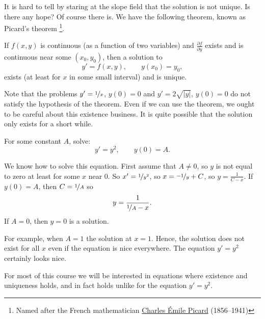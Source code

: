It is hard to tell by staring at the slope field that the
solution is not
unique.
Is there any hope?
Of course there is.  We have the following theorem,
known as Picard's theorem%
\footnote{Named after the French mathematician
\href{https://en.wikipedia.org/wiki/Charles_\%C3\%89mile_Picard}{Charles \'Emile Picard}
(1856--1941)}. 

\begin{theorem}%
\label{slope:picardthm}%
If $f(x,y)$ is continuous (as a function of two
variables) and $\frac{\partial f}{\partial y}$ exists and is
continuous near some $(x_0,y_0)$, then a solution to
\begin{equation*}
y' = f(x,y), \qquad y(x_0) = y_0,
\end{equation*}
exists (at least for $x$ in some small interval) and is unique.
\end{theorem}

Note that the problems $y' = \nicefrac{1}{x}$, $y(0) = 0$ and 
$y' = 2 \sqrt{\lvert y \rvert}$, $y(0) = 0$ do not satisfy the hypothesis of the
theorem.
Even if we can use the theorem,
we ought to be careful about this existence business.  It is quite
possible that the solution only exists for a short while.

\begin{example}
For some constant $A$, solve:
\[
y' = y^2, \qquad y(0) = A .
\]

We know how to solve this equation.  First assume that $A \not= 0$,
so $y$ is not equal to zero at least for some $x$ near 0.  So
$x' = \nicefrac{1}{y^2}$, so
$x = \nicefrac{-1}{y} + C$, so $y = \frac{1}{C-x}$.  If $y(0) = A$, then
$C = \nicefrac{1}{A}$ so
\begin{equation*}
y = \frac{1}{\nicefrac{1}{A} - x} .
\end{equation*}
If $A=0$, then $y=0$ is a solution.

For example, when $A=1$
the solution  at $x=1$.  Hence, the solution does not exist
for all $x$ even if the equation is nice everywhere.  The equation
$y' = y^2$ certainly
looks nice.
\end{example}

For most of this
course we will be interested in equations where existence and
uniqueness holds, and in fact holds  unlike for the equation
$y'=y^2$.

